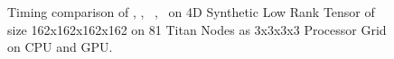 \begin{figure}

\caption{Timing comparison of \MU, \HALS, \BPP\, \ADMM, \Nestrov\ on 4D Synthetic Low Rank Tensor of size 162x162x162x162 on 81 Titan Nodes as 3x3x3x3 Processor Grid on CPU and GPU.}
\label{fig:cpuvsgpulowrank}
\end{figure}


